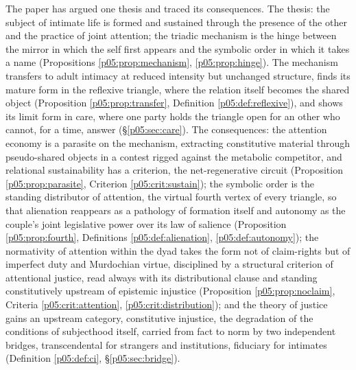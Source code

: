 \documentclass[11pt,a4paper]{article}
\theoremstyle{seriesthm}
\begin{document}
The paper has argued one thesis and traced its consequences. The thesis: the subject of intimate life is formed and sustained through the presence of the other and the practice of joint attention; the triadic mechanism is the hinge between the mirror in which the self first appears and the symbolic order in which it takes a name (Propositions \ref{p05:prop:mechanism}, \ref{p05:prop:hinge}). The mechanism transfers to adult intimacy at reduced intensity but unchanged structure, finds its mature form in the reflexive triangle, where the relation itself becomes the shared object (Proposition \ref{p05:prop:transfer}, Definition \ref{p05:def:reflexive}), and shows its limit form in care, where one party holds the triangle open for an other who cannot, for a time, answer (§\ref{p05:sec:care}). The consequences: the attention economy is a parasite on the mechanism, extracting constitutive material through pseudo-shared objects in a contest rigged against the metabolic competitor, and relational sustainability has a criterion, the net-regenerative circuit (Proposition \ref{p05:prop:parasite}, Criterion \ref{p05:crit:sustain}); the symbolic order is the standing distributor of attention, the virtual fourth vertex of every triangle, so that alienation reappears as a pathology of formation itself and autonomy as the couple's joint legislative power over its law of salience (Proposition \ref{p05:prop:fourth}, Definitions \ref{p05:def:alienation}, \ref{p05:def:autonomy}); the normativity of attention within the dyad takes the form not of claim-rights but of imperfect duty and Murdochian virtue, disciplined by a structural criterion of attentional justice, read always with its distributional clause and standing constitutively upstream of epistemic injustice (Proposition \ref{p05:prop:noclaim}, Criteria \ref{p05:crit:attention}, \ref{p05:crit:distribution}); and the theory of justice gains an upstream category, constitutive injustice, the degradation of the conditions of subjecthood itself, carried from fact to norm by two independent bridges, transcendental for strangers and institutions, fiduciary for intimates (Definition \ref{p05:def:ci}, §\ref{p05:sec:bridge}).
\end{document}
